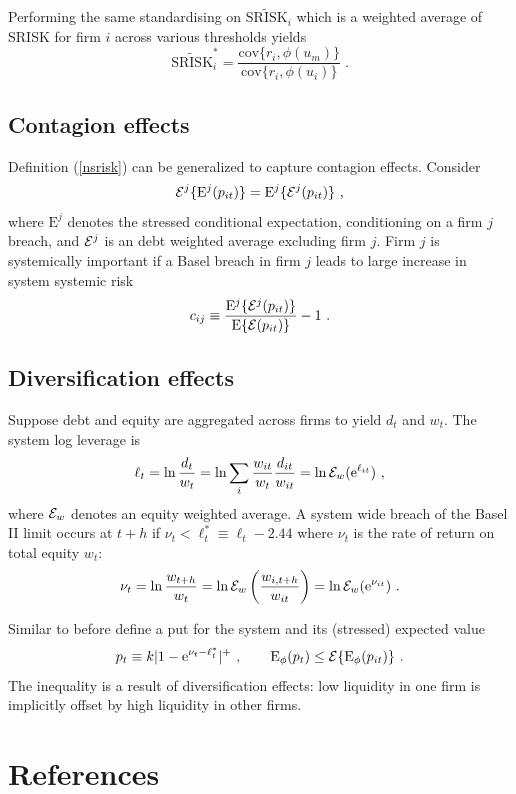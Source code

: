 \documentclass[authoryear]{elsarticle}
\newcommand{\E}{\mathrm{E}}
\newcommand{\e}{\mathrm{e}}
\newcommand{\cov}{\mathrm{cov}}
\newcommand{\Ex}{{\cal E}}
\newcommand{\eref}[1]{(\ref{#1})}
\newcommand{\cq}{\ , \qquad}
\newcommand{\be}[1]{\begin{equation}\label{#1}}
\newcommand{\ee}{\end{equation}}
\begin{document}
Performing the same standardising on $\widetilde{\mathrm{SRISK}}_i$ which is a weighted average of SRISK for firm $i$ across various thresholds yields
$$
\widetilde{\mathrm{SRISK}}_i^* = \frac{\cov\{r_i,\phi(u_m)\}}{\cov\{r_i,\phi(u_i)\}}   \;.
$$




\subsection{Contagion effects}
Definition \eref{nsrisk} can be generalized to capture contagion effects.  Consider 
\be{cont}
\Ex^j\{\E^j(p_{it})\}=\E^j\{\Ex^j(p_{it})\}\ ,
\ee
where  $\E^j$ denotes the stressed conditional expectation, conditioning on a firm $j$ breach, and $\Ex^j$ is an debt weighted average excluding firm $j$.  Firm $j$ is systemically important  if a Basel breach in firm $j$ leads to large increase in system systemic risk
$$
c_{ij}\equiv \frac{\E^j\{\Ex^j(p_{it})\}}{\E\{\Ex(p_{it})\}}-1\ .
$$

\subsection{Diversification effects} 

Suppose debt and equity are  aggregated across firms to yield $d_t$ and $w_t$.  The system log leverage is  
$$
\ell_t =  \ln \frac{d_t}{w_t} =  \ln \sum_i\frac{w_{it}}{w_t}\frac{ d_{it}}{ w_{it}} = \ln \Ex_w(\e^{\ell_{it}}) \ ,
$$
where $\Ex_w$ denotes an equity weighted average.  A system wide breach of the Basel II limit occurs at $t+h$ if
$
\nu_t < \ell_t^*\equiv \ell_t - 2.44
$
where $\nu_t$ is the rate of return on total equity $w_t$:
\be{ew}
 \nu_t = \ln \frac{w_{t+h}}{w_t} = \ln \Ex_w\left(\frac{w_{i,t+h}}{w_{it}}\right) = \ln \Ex_w(\e^{\nu_{it}})\ . 
\ee

Similar to before define a put for the system and its (stressed) expected value
$$
p_t\equiv k|1-\e^{\nu_t-\ell_t^*}|^+\cq \Es(p_t)\le\Ex\{\Es(p_{it})\}\ .
$$
The inequality is a result  of diversification effects:   low liquidity  in one firm is implicitly offset by high liquidity  in other  firms.







\section*{References}

\end{document}
